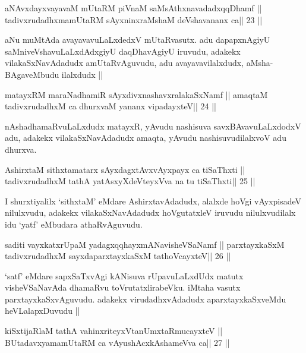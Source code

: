 

\begin{shl}
aNAvxdayxvayavaM mUtaRM piVnaM saMsAthxnavadadxqqDhamf ||
tadivxrudadhxmamUtaRM sAyxninxraMshaM deVshavananx ca\hfill || 23 ||
\end{shl}

\begin{artha}
aNu muMtAda avayavavuLaLxdedxV mUtaRvasutx. adu dapapxnAgiyU
saMniveVshavuLaLxdAdxgiyU daqDhavAgiyU iruvudu, adakekx
vilakaSxNavAdadudx amUtaRvAguvudu, adu avayavavilalxdudx,
aMsha-BAgaveMbudu ilalxdudx ||
\end{artha}



\begin{shl}
matayxRM maraNadhamiR sAyxdivxnashavxralakaSxNamf ||
amaqtaM tadivxrudadhxM ca dhurxvaM yananx vipadayxteV\hfill || 24 ||
\end{shl}

\begin{artha}
nAshadhamaRvuLaLxdudx matayxR, yAvudu nashisuva savxBAvavuLaLxdodxV
adu, adakekx vilakaSxNavAdadudx amaqta, yAvudu nashisuvudilalxvoV adu dhurxva.
\end{artha}

\begin{shl}
AshirxtaM sithxtamatarx sAyxdagxtAvx\s vAyxpayx ca tiSaThxti ||
tadivxrudadhxM tathA yatAsxyXdeVteyxVva na tu tiSaThxti\hfill || 25 ||
\end{shl}

\begin{artha}
I shurxtiyalilx `sithxtaM' eMdare AshirxtavAdadudx, alalxde hoVgi
vAyxpisadeV nilulxvudu, adakekx vilakaSxNavAdadudx hoVgutatxleV
iruvudu nilulxvudilalx idu `yatf' eMbudara athaRvAguvudu.
\end{artha}

\begin{shl}
saditi vayxkatxrUpaM yadagxqqhayxmANavisheVSaNamf ||
parxtayxkaSxM tadivxrudadhxM sayxdaparxtayxkaSxM tathoVcayxteV\hfill || 26 ||
\end{shl}

\begin{artha}
`satf' eMdare sapxSaTxvAgi kANisuva rUpavuLaLxdUdx matutx visheVSaNavAda
dhamaRvu toVrutatxlirabeVku. iMtaha vasutx
parxtayxkaSxvAguvudu. adakekx virudadhxvAdadudx aparxtayxkaSxveMdu
heVLalapxDuvudu ||
\end{artha}

\begin{shl}
kiSxtijaRlaM tathA vahinxriteyxVtanUmxtaRmucayxteV ||
BUtadavxyamamUtaRM ca vAyushAcx\s\s kAshameVva ca\hfill || 27 ||
\end{shl}

